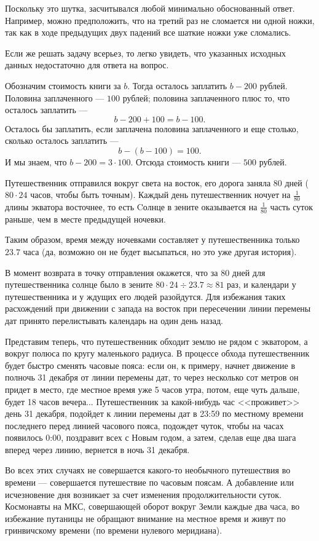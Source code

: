 ﻿
\begin{itemize}

\itA Поскольку это шутка, засчитывался любой минимально обоснованный ответ. 
Например, можно предположить, что на третий раз не сломается ни одной ножки, 
так как в ходе предыдущих двух падений все шаткие ножки уже сломались. 

Если же решать задачу всерьез, то легко увидеть, что указанных исходных данных
недостаточно для ответа на вопрос. 

\itB Обозначим стоимость книги за $b$. Тогда осталось заплатить $b - 200$ рублей.
Половина заплаченного --- $100$ рублей; половина заплаченного плюс то, что
осталось заплатить ---
	$$b - 200 + 100 = b - 100.$$
Осталось бы заплатить, если заплачена половина 
заплаченного и еще столько, сколько
осталось заплатить ---
	$$b - (b - 100) = 100.$$
И мы знаем, что $b - 200 = 3 \cdot 100$. Отсюда стоимость книги --- $500$ рублей.

\itC Путешественник отправился вокруг света на восток, его дорога 
заняла $80$ дней ($80 \cdot 24$ часов, чтобы быть точным). 
Каждый день путешественник ночует на $\frac{1}{80}$ длины 
экватора восточнее, то есть Cолнце в зените оказывается на $\frac{1}{80}$ часть
суток раньше, чем в месте предыдущей ночевки.

Таким образом, время между 
ночевками составляет у путешественника только $23.7$ часа (да, возможно он не будет 
высыпаться, но это уже другая история). 

В момент возврата в точку отправления окажется, что за $80$ дней для путешественника
солнце было в зените $80 \cdot 24 \div 23.7 \approx 81$ раз, и календари у путешественника
и у ждущих его людей разойдутся. Для избежания таких расхождений при движении с запада на восток
при пересечении линии перемены дат принято перелистывать календарь на один день назад.

Представим теперь, что путешественник обходит землю не рядом с экватором, 
а вокруг полюса по кругу маленького радиуса. В процессе обхода путешественник 
будет быстро сменять часовые пояса: если он, к примеру, начнет движение в полночь 
31 декабря от линии перемены дат, то через несколько сот метров он придет в место, 
где местное время уже 5 часов утра, потом, еще чуть дальше, 
будет 18 часов вечера... Путешественник за какой-нибудь час <<проживет>> день 31 декабря, 
подойдет к линии перемены дат в 23:59 по местному времени последнего перед 
линией часового пояса, подождет чуток, чтобы на часах появилось
0:00, поздравит всех с Новым годом, а затем, сделав еще два шага вперед 
через линию, вернется в ночь 31 декабря. 

Во всех этих случаях не совершается какого-то необычного путешествия во 
времени --- совершается путешествие по часовым поясам. 
А добавление или исчезновение 
дня возникает за счет изменения продолжительности суток. Космонавты на МКС,
совершающей оборот вокруг Земли каждые два часа, во избежание путаницы не
обращают внимание на местное время и живут по гринвичскому времени (по времени
нулевого меридиана).
\end{itemize}
